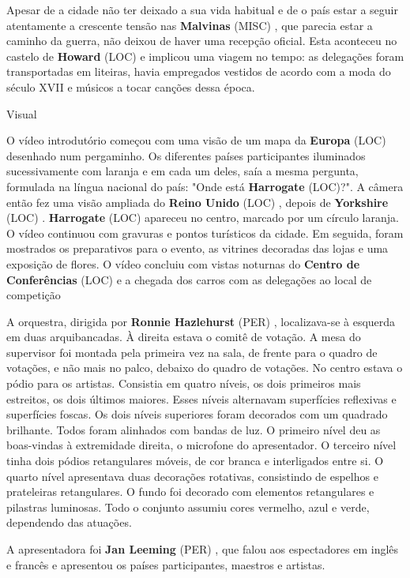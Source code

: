 \documentclass[12pt,a4paper]{article}
\begin{document}
Apesar de a cidade não ter deixado a sua vida habitual e de o país estar a seguir atentamente a crescente tensão nas \textbf{Malvinas} (MISC) , que parecia estar a caminho da guerra, não deixou de haver uma recepção oficial. Esta aconteceu no castelo de \textbf{Howard} (LOC) e implicou uma viagem no tempo: as delegações foram transportadas em liteiras, havia empregados vestidos de acordo com a moda do século XVII e músicos a tocar canções dessa época.



Visual

O vídeo introdutório começou com uma visão de um mapa da \textbf{Europa} (LOC) desenhado num pergaminho. Os diferentes países participantes iluminados sucessivamente com laranja e em cada um deles, saía a mesma pergunta, formulada na língua nacional do país: "Onde está \textbf{Harrogate} (LOC)?". A câmera então fez uma visão ampliada do \textbf{Reino Unido} (LOC) , depois de \textbf{Yorkshire} (LOC) . \textbf{Harrogate} (LOC) apareceu no centro, marcado por um círculo laranja. O vídeo continuou com gravuras e pontos turísticos da cidade. Em seguida, foram mostrados os preparativos para o evento, as vitrines decoradas das lojas e uma exposição de flores. O vídeo concluiu com vistas noturnas do \textbf{Centro de Conferências} (LOC) e a chegada dos carros com as delegações ao local de competição

A orquestra, dirigida por \textbf{Ronnie Hazlehurst} (PER) , localizava-se à esquerda em duas arquibancadas. À direita estava o comitê de votação. A mesa do supervisor foi montada pela primeira vez na sala, de frente para o quadro de votações, e não mais no palco, debaixo do quadro de votações. No centro estava o pódio para os artistas. Consistia em quatro níveis, os dois primeiros mais estreitos, os dois últimos maiores. Esses níveis alternavam superfícies reflexivas e superfícies foscas. Os dois níveis superiores foram decorados com um quadrado brilhante. Todos foram alinhados com bandas de luz. O primeiro nível deu as boas-vindas à extremidade direita, o microfone do apresentador. O terceiro nível tinha dois pódios retangulares móveis, de cor branca e interligados entre si. O quarto nível apresentava duas decorações rotativas, consistindo de espelhos e prateleiras retangulares. O fundo foi decorado com elementos retangulares e pilastras luminosas. Todo o conjunto assumiu cores vermelho, azul e verde, dependendo das atuações.

A apresentadora foi \textbf{Jan Leeming} (PER) , que falou aos espectadores em inglês e francês e apresentou os países participantes, maestros e artistas.
\end{document}
